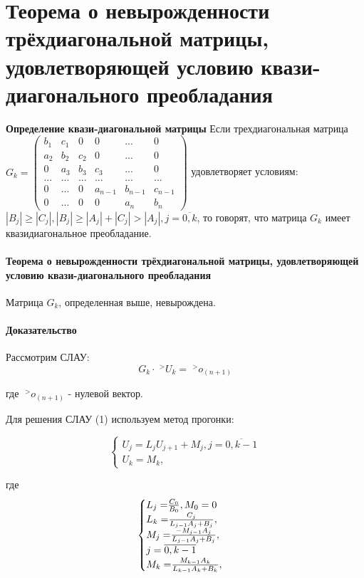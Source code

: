 \documentclass[__main__.tex]{subfiles}
\begin{document}
\section{Теорема о невырожденности трёхдиагональной матрицы, удовлетворяющей условию квази-диагонального преобладания}


\textbf{Определение квази-диагональной матрицы}
	Если трехдиагональная матрица $G_k = \left(
	\begin{matrix}
	b_1 & c_1 & 0 & 0 & ... & 0 \\
	a_2 & b_2 & c_2 & 0 &... & 0 \\
	0 & a_3 & b_3 & c_3 & ... & 0 \\
	... & ... & ... & ... & ... & ...\\
	0 & ... & 0 & a_{n-1} & b_{n-1} & c_{n-1} \\
	0 & ... & 0 & 0 & a_{n} & b_{n}
	\end{matrix}
	\right)$ удовлетворяет условиям: $ |B_j|  \geq  |C_j|, |B_j|  \geq |A_j| + |C_j| > |A_j|, j = \overline{0,k}$, то говорят, что матрица $G_k$ имеет квазидиагональное преобладание.

	\paragraph{Теорема о невырожденности трёхдиагональной матрицы, удовлетворяющей условию квази-диагонального преобладания}
	
		Матрица $G_k$, определенная выше, невырождена.

\paragraph{Доказательство}
	Рассмотрим СЛАУ:
	\begin{equation}
	\label{13.1}
	G_k \cdot \;^{>}U_{k} = \;^{>}o_{(n+1)}
	\end{equation}
	
	 где $\;^{>}o_{(n+1)}$ - нулевой вектор.
	 
	 Для решения СЛАУ (1) используем метод прогонки:
	 
	 \begin{equation}\label{13.2}
	 \begin{cases}
	 U_j = L_j U_{j+1} + M_j , j = \overline{0,k-1} \\
	 U_k = M_k,
	 \end{cases}
\end{equation}

где 
 \begin{equation}
\begin{cases}\label{13.3}
L_j = $${C_{0}}\over{B_0}$$ , M_0 = 0 \\
L_k = $${C_{j}}\over{L_{j-1}A_j + B_j}$$,\\
M_j = $${-M_{j-1}A_j}\over{L_{j-1}A_j + B_j}$$,\\ 
j = \overline{0,k-1} \\
M_k = $${M_{k-1}A_k}\over{L_{k-1}A_k + B_k}$$,
\end{cases}
\end{equation}
\end{document}
